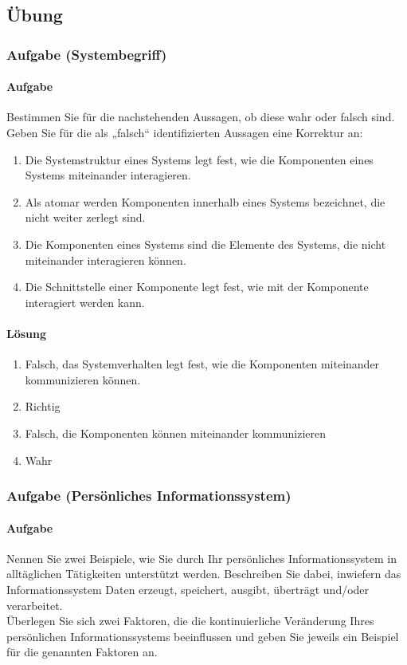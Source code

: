 \subsection{Übung}

\subsubsection*{Aufgabe (Systembegriff)}
\paragraph*{Aufgabe}
    Bestimmen Sie für die nachstehenden Aussagen, ob diese wahr oder falsch sind. Geben Sie für die als „falsch“ identifizierten Aussagen eine Korrektur an:
    \begin{enumerate}[label=\alph*)]
        \item Die Systemstruktur eines Systems legt fest, wie die Komponenten eines Systems miteinander interagieren.
        \item Als atomar werden Komponenten innerhalb eines Systems bezeichnet, die nicht weiter zerlegt sind.
        \item Die Komponenten eines Systems sind die Elemente des Systems, die nicht miteinander interagieren können.
        \item Die Schnittstelle einer Komponente legt fest, wie mit der Komponente interagiert werden kann.
    \end{enumerate}
\paragraph*{Lösung}
    \begin{enumerate}[label=\alph*)]
        \item Falsch, das Systemverhalten legt fest, wie die Komponenten miteinander kommunizieren können.
        \item Richtig
        \item Falsch, die Komponenten können miteinander kommunizieren
        \item Wahr
    \end{enumerate}

\subsubsection*{Aufgabe (Persönliches Informationssystem)}
\paragraph*{Aufgabe}
    Nennen Sie zwei Beispiele, wie Sie durch Ihr persönliches Informationssystem in alltäglichen Tätigkeiten unterstützt werden. Beschreiben Sie dabei, inwiefern das Informationssystem Daten erzeugt, speichert, ausgibt, überträgt und/oder verarbeitet. \\
    Überlegen Sie sich zwei Faktoren, die die kontinuierliche Veränderung Ihres persönlichen Informationssystems beeinflussen und geben Sie jeweils ein Beispiel für die genannten Faktoren an.
